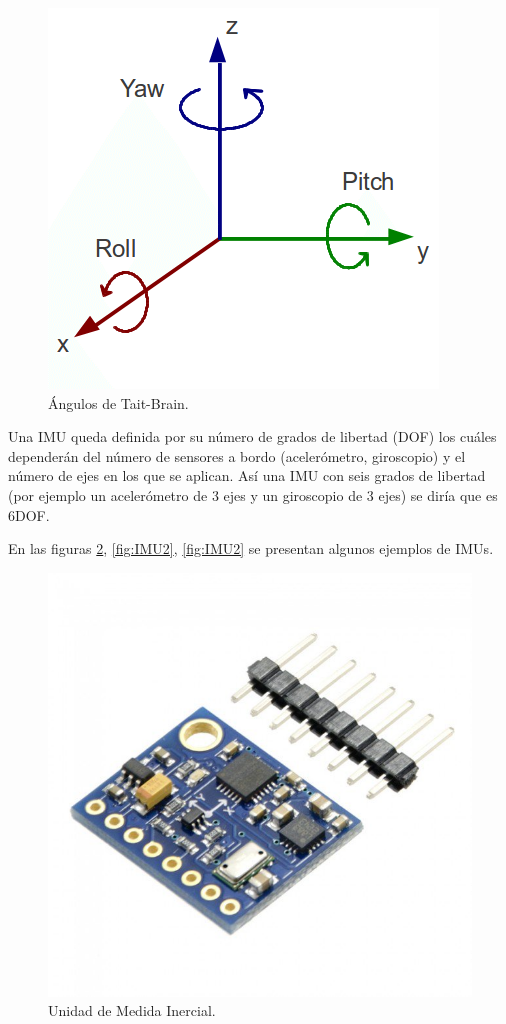 \begin{figure}[H]
	\center
	\includegraphics[scale=0.5]{imagenes/Balancing_robot/orientacion}
	\caption{Ángulos de Tait-Brain.}
	\label{fig:orientacion}
\end{figure}


Una IMU queda definida por su número de grados de libertad (DOF) los cuáles dependerán del número de sensores a bordo (acelerómetro, giroscopio) y el número de ejes en los que se aplican. Así una IMU con seis grados de libertad (por ejemplo un acelerómetro de 3 ejes y un giroscopio de 3 ejes) se diría que es 6DOF. \newline

En las figuras \ref{fig:IMU1}, \ref{fig:IMU2}, \ref{fig:IMU2} se presentan algunos ejemplos de IMUs.

\begin{figure}[H]
	\center
	\includegraphics[scale=0.2]{imagenes/Balancing_robot/IMU1}
	\caption{Unidad de Medida Inercial.}
	\label{fig:IMU1}
\end{figure}

